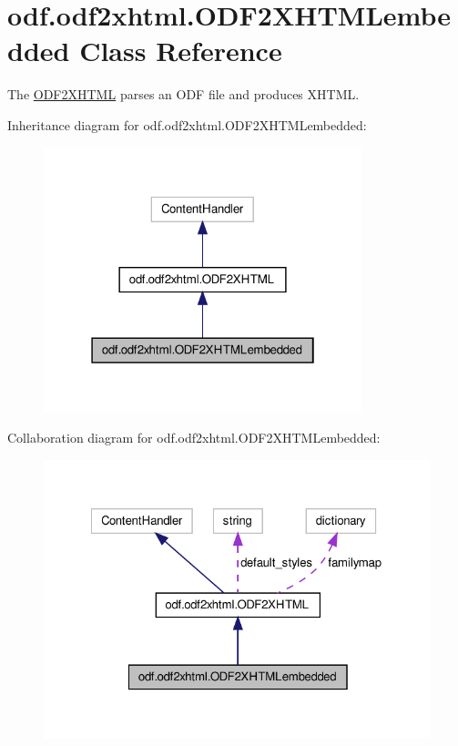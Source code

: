 \hypertarget{classodf_1_1odf2xhtml_1_1ODF2XHTMLembedded}{\section{odf.\+odf2xhtml.\+O\+D\+F2\+X\+H\+T\+M\+Lembedded Class Reference}
\label{classodf_1_1odf2xhtml_1_1ODF2XHTMLembedded}
}


The \hyperlink{classodf_1_1odf2xhtml_1_1ODF2XHTML}{O\+D\+F2\+X\+H\+T\+M\+L} parses an O\+D\+F file and produces X\+H\+T\+M\+L.  




Inheritance diagram for odf.\+odf2xhtml.\+O\+D\+F2\+X\+H\+T\+M\+Lembedded\+:
\nopagebreak
\begin{figure}[H]
\begin{center}
\leavevmode
\includegraphics[width=262pt]{classodf_1_1odf2xhtml_1_1ODF2XHTMLembedded__inherit__graph}
\end{center}
\end{figure}


Collaboration diagram for odf.\+odf2xhtml.\+O\+D\+F2\+X\+H\+T\+M\+Lembedded\+:
\nopagebreak
\begin{figure}[H]
\begin{center}
\leavevmode
\includegraphics[width=322pt]{classodf_1_1odf2xhtml_1_1ODF2XHTMLembedded__coll__graph}
\end{center}
\end{figure}
